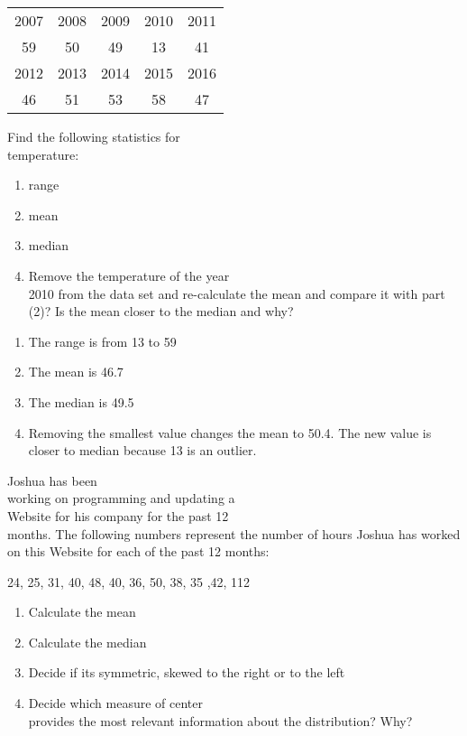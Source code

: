 \documentclass[11pt]{book}\usepackage[]{graphicx}\usepackage[]{color}
\begin{document}
\begin{exercises}
\begin{exercise}
\begin{tabular}{@{} ccccc @{}} \hline
2007 & 2008 & 2009 & 2010 & 2011 \\
59 & 50 & 49 & 13 & 41 \\ \hline
2012 & 2013 & 2014 & 2015 & 2016 \\
46 & 51 & 53 & 58 & 47 \\ \hline
\end{tabular}

Find the following statistics for \\ temperature:

\begin{enumerate}
\item range
\item mean
\item median
\item Remove the temperature of the year \\ 2010 from the data set and re-calculate the mean and compare it with part (2)? Is the mean closer to the median and why?
\end{enumerate}

   \end{exercise}
   \begin{solution} %



\begin{enumerate}
\item The range is from 13 to 59
\item The mean is 46.7
\item The median is 49.5
\item Removing the smallest value changes the mean to 50.4.  The new value is closer to median because 13 is an outlier.
\end{enumerate}
  \end{solution}
 
   \begin{exercise} %

Joshua has been \\ working  on  programming  and updating a \\ Website for his  company for the past 12 \\ months. The following numbers represent the number of hours Joshua  has worked on this Website for each of the past 12 months:

24, 25, 31, 40, 48, 40, 36, 50, 38, 35 ,42, 112

\begin{enumerate}
\item Calculate the mean
\item Calculate the median
\item Decide if its symmetric, skewed to the right or to the left
\item Decide which measure of center \\ provides the most relevant information about the distribution? Why?
\end{enumerate}


\end{exercise}
\end{exercises}
\end{document}
